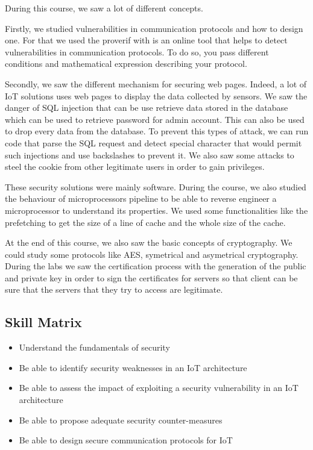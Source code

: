 During this course, we saw a lot of different concepts.
\\\par
Firstly, we studied vulnerabilities in communication protocols and how to design one. For that we used the proverif with is an online tool that helps to detect vulnerabilities in communication protocols. To do so, you pass different conditions and mathematical expression describing your protocol.
\\\par
Secondly, we saw the different mechanism for securing web pages. Indeed, a lot of IoT solutions uses web pages to display the data collected by sensors. We saw the danger of SQL injection that can be use retrieve data stored in the database which can be used to retrieve password for admin account. This can also be used to drop every data from the database. To prevent this types of attack, we can run code that parse the SQL request and detect special character that would permit such injections and use backslashes to prevent it. We also saw some attacks to steel the cookie from other legitimate users in order to gain privileges. 
\\\par
These security solutions were mainly software. During the course, we also studied the behaviour of microprocessors pipeline to be able to reverse engineer a microprocessor to understand its properties. We used some functionalities like the prefetching to get the size of a line of cache and the whole size of the cache. 
\\\par
At the end of this course, we also saw the basic concepts of cryptography. We could study some protocols like AES, symetrical and asymetrical cryptography. During the labs we saw the certification process with the generation of the public and private key in order to sign the certificates for servers so that client can be sure that the servers that they try to access are legitimate.

\subsection{Skill Matrix}
\begin{itemize}
    \item Understand the fundamentals of security
    \item Be able to identify security weaknesses in an IoT architecture
    \item Be able to assess the impact of exploiting a security vulnerability in an IoT architecture
    \item Be able to propose adequate security counter-measures
    \item Be able to design secure communication protocols for IoT
\end{itemize}

